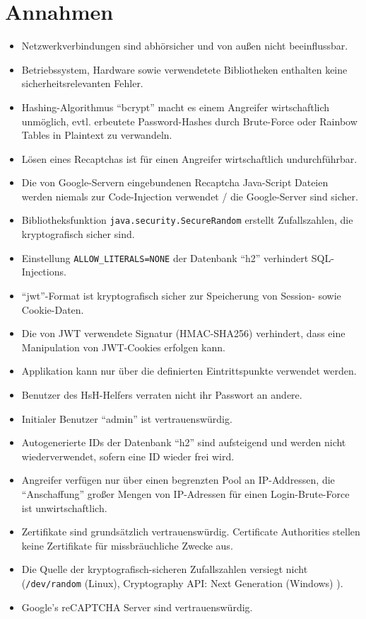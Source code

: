 \documentclass[fontsize=12pt,DIV=14,BCOR=10mm,a4paper,parskip=half-,ngerman,english,bibliography=totocnumbered]{scrreprt}
\begin{document}
\vspace*{-3cm}

\clearpage

\tableofcontents  %

\clearpage

\chapter{Annahmen}

\begin{itemize}
  \item Netzwerkverbindungen sind abhörsicher und von außen nicht beeinflussbar.
  \item Betriebssystem, Hardware sowie verwendetete Bibliotheken enthalten keine sicherheitsrelevanten Fehler.
  \item Hashing-Algorithmus \enquote{bcrypt} macht es einem Angreifer wirtschaftlich unmöglich, evtl. erbeutete Password-Hashes durch Brute-Force oder Rainbow Tables in Plaintext zu verwandeln.
  \item Lösen eines Recaptchas ist für einen Angreifer wirtschaftlich undurchführbar.
  \item Die von Google-Servern eingebundenen Recaptcha Java-Script Dateien werden niemals zur Code-Injection verwendet / die Google-Server sind sicher.
  \item Bibliotheksfunktion \texttt{java.security.SecureRandom} \autocite{JavaDocs.SecureRandom} erstellt Zufallszahlen, die kryptografisch sicher sind.
  \item Einstellung \texttt{ALLOW\_LITERALS=NONE} der Datenbank \enquote{h2} verhindert SQL-Injections.
  \item \enquote{\gls{jwt}}-Format ist kryptografisch sicher zur Speicherung von Session- sowie Cookie-Daten.
  \item Die von JWT verwendete Signatur (HMAC-SHA256) verhindert, dass eine Manipulation von JWT-Cookies erfolgen kann.
  \item Applikation kann nur über die definierten Eintrittspunkte verwendet werden.
  \item Benutzer des HsH-Helfers verraten nicht ihr Passwort an andere.
  \item Initialer Benutzer \enquote{admin} ist vertrauenswürdig.
  \item Autogenerierte IDs der Datenbank \enquote{h2} sind aufsteigend und werden nicht wiederverwendet, sofern eine ID wieder frei wird.
  \item Angreifer verfügen nur über einen begrenzten Pool an IP-Addressen, die ``Anschaffung'' großer Mengen von IP-Adressen für einen Login-Brute-Force ist unwirtschaftlich.
  \item Zertifikate sind grundsätzlich vertrauenswürdig. Certificate Authorities stellen keine Zertifikate für missbräuchliche Zwecke aus.
  \item Die Quelle der kryptografisch-sicheren Zufallszahlen versiegt nicht (\texttt{/dev/random} (Linux), Cryptography API: Next Generation (Windows) \autocite{Windows.SecureRandom}).
  \item Google's reCAPTCHA Server sind vertrauenswürdig.
\end{itemize}
\end{document}
